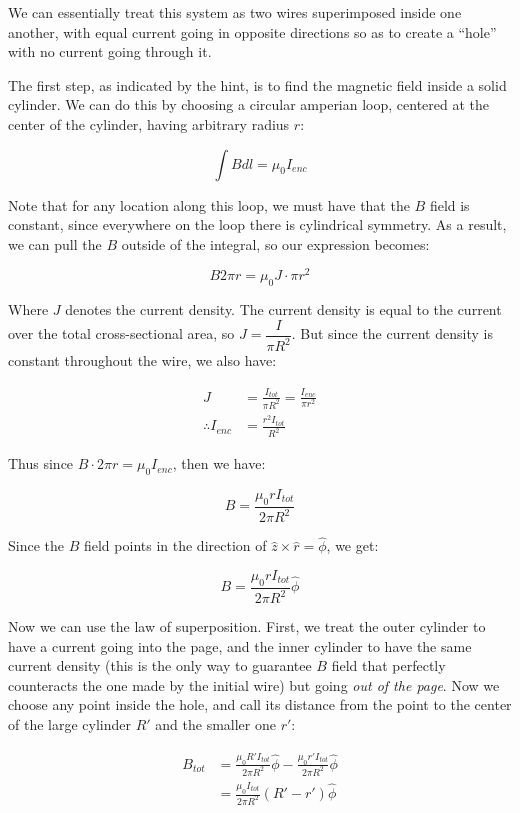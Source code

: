 \documentclass{article}
\theoremstyle{definition}
\numberwithin{equation}{section}
\numberwithin{definition}{section}
\begin{document}
We can essentially treat this system as two wires superimposed inside one another, with equal current going in opposite directions so as to create a ``hole'' with no current going through it.

The first step, as indicated by the hint, is to find the magnetic field inside a solid cylinder. We can do this by choosing a circular amperian loop, centered at the center of the cylinder, having arbitrary radius $r$:

\[\int B dl = \mu_0 I_{enc}\]

Note that for any location along this loop, we must have that the $B$ field is constant, since everywhere on the loop there is cylindrical symmetry. As a result, we can pull the $B$ outside of the integral, so our expression becomes:

\[ B 2\pi r = \mu_0 J \cdot \pi r^2\]

Where $J$ denotes the current density. The current density is equal to the current over the total cross-sectional area, so $J = \dfrac{I}{\pi R^2}$. But since the current density is constant throughout the wire, we also have: 

\begin{align*}
  J &= \frac{I_{tot}}{\pi R^2} = \frac{I_{enc}}{\pi r^2}\\
  \therefore I_{enc} &= \frac{r^2 I_{tot}}{R^2}
\end{align*}

Thus since $B \cdot 2\pi r = \mu_0 I_{enc}$, then we have:

\[ B = \frac{\mu_0 r I_{tot}}{2\pi R^2}\]

Since the $B$ field points in the direction of $\hat z \times \hat r = \hat \phi$, we get:

\[ B = \frac{\mu_0 rI_{tot}}{2\pi R^2} \hat \phi\]

Now we can use the law of superposition. First, we treat the outer cylinder to have a current going into the page, and the inner cylinder to have the same current density (this is the only way to guarantee $B$ field that perfectly counteracts the one made by the initial wire) but going \textit{out of the page}. Now we choose any point inside the hole, and call its distance from the point to the center of the large cylinder $R'$ and the smaller one $r'$:

\begin{align*}
  B_{tot} &= \frac{\mu_0 R' I_{tot}}{2\pi R^2} \hat \phi - \frac{\mu_0 r' I_{tot}}{2\pi R^2} \hat \phi\\
  &= \frac{\mu_0 I_{tot}}{2\pi R^2}(R' - r') \hat \phi
\end{align*}
\end{document}
